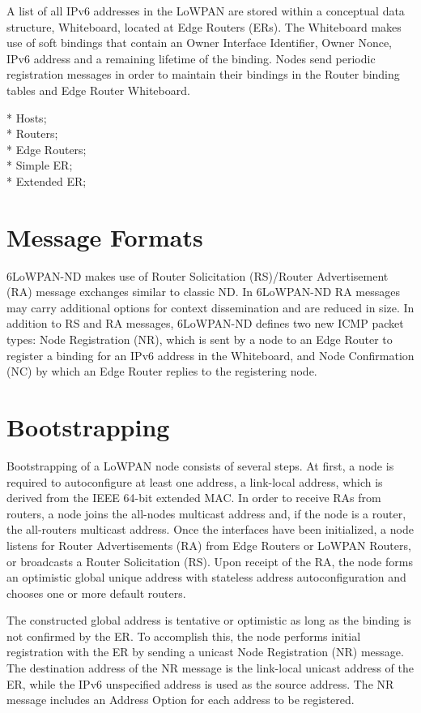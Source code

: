 A list of all IPv6 addresses in the LoWPAN are stored within a conceptual data structure, Whiteboard, located at Edge Routers (ERs). The Whiteboard makes use of soft bindings that contain an Owner Interface Identifier, Owner Nonce, IPv6 address and a remaining lifetime of the binding. Nodes send periodic registration messages in order to maintain their bindings in the Router binding tables and Edge Router Whiteboard. 

* Hosts;\\
* Routers;\\
* Edge Routers;\\
* Simple ER; \\
* Extended ER;

\section{Message Formats}

6LoWPAN-ND makes use of Router Solicitation (RS)/Router Advertisement (RA) message exchanges similar to classic ND. In 6LoWPAN-ND RA messages may carry additional options for context dissemination and are reduced in size. In addition to RS and RA messages, 6LoWPAN-ND defines two new ICMP packet types: Node Registration (NR), which is sent by a node to an Edge Router to register a binding for an IPv6 address in the Whiteboard, and Node Confirmation (NC) by which an Edge Router replies to the registering node. 

\section{Bootstrapping}
Bootstrapping of a LoWPAN node consists of several steps.  At first, a node is required to autoconfigure at least one address, a link-local address, which is derived from the IEEE 64-bit extended MAC. In order to receive RAs from routers, a node joins the all-nodes multicast address and, if the node is a router, the all-routers multicast address. Once the interfaces have been initialized, a node listens for Router Advertisements (RA) from Edge Routers or LoWPAN Routers, or broadcasts a Router Solicitation (RS). Upon receipt of the RA, the node forms an optimistic global unique address with stateless address autoconfiguration and chooses one or more default routers. 

The constructed global address is tentative or optimistic as long as the binding is not confirmed by the ER. To accomplish this, the node performs initial registration with the ER by sending a unicast Node Registration (NR) message. The destination address of the NR message is the link-local unicast address of the ER, while the IPv6 unspecified address is used as the source address.  The NR message includes an Address Option for each address to be registered. 

